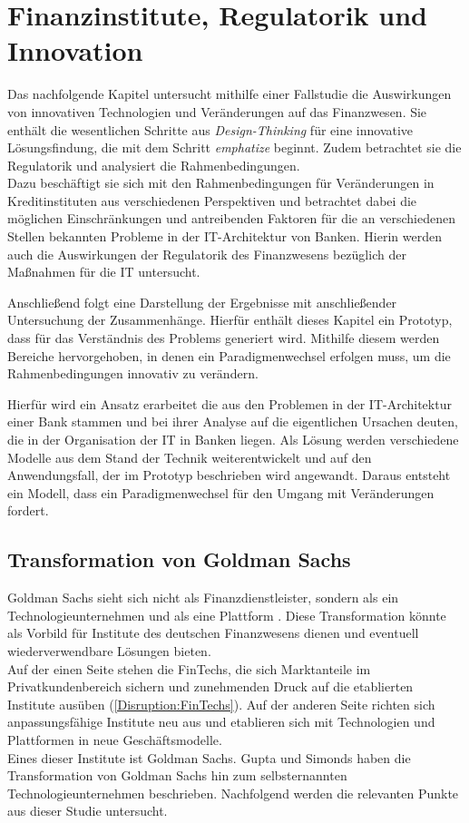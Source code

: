 \chapter{Finanzinstitute, Regulatorik und Innovation}
\label{ch:background}
Das nachfolgende Kapitel untersucht mithilfe einer Fallstudie die Auswirkungen von innovativen Technologien und Veränderungen auf das Finanzwesen. Sie enthält die wesentlichen Schritte aus \emph{Design-Thinking} für eine innovative Lösungsfindung, die mit dem Schritt \emph{emphatize} beginnt. Zudem betrachtet sie die Regulatorik und analysiert die Rahmenbedingungen.
\medskip
\\
Dazu beschäftigt sie sich mit den Rahmenbedingungen für Veränderungen in Kreditinstituten aus verschiedenen Perspektiven und betrachtet dabei die möglichen Einschränkungen und antreibenden Faktoren für die an verschiedenen Stellen bekannten Probleme in der IT-Architektur von Banken. Hierin werden auch die Auswirkungen der Regulatorik des Finanzwesens bezüglich der Maßnahmen für die IT untersucht.

Anschließend folgt eine Darstellung der Ergebnisse mit anschließender Untersuchung der Zusammenhänge. Hierfür enthält dieses Kapitel ein Prototyp, dass für das Verständnis des Problems generiert wird. 
Mithilfe diesem werden Bereiche hervorgehoben, in denen ein Paradigmenwechsel erfolgen muss, um die Rahmenbedingungen innovativ zu verändern. 

Hierfür wird ein Ansatz erarbeitet die aus den Problemen in der IT-Architektur einer Bank stammen und bei ihrer Analyse auf die eigentlichen Ursachen deuten, die in der Organisation der IT in Banken liegen. Als Lösung werden verschiedene Modelle aus dem Stand der Technik weiterentwickelt und auf den Anwendungsfall, der im Prototyp beschrieben wird angewandt. Daraus entsteht ein Modell, dass ein Paradigmenwechsel für den Umgang mit Veränderungen fordert.

\section{Transformation von Goldman Sachs}
\label{section:Goldman}
Goldman Sachs sieht sich nicht als Finanzdienstleister, sondern als ein Technologieunternehmen und als eine Plattform \cite{Gupta:2017}. Diese Transformation könnte als Vorbild für Institute des deutschen Finanzwesens dienen und eventuell wiederverwendbare Lösungen bieten.
\medskip
\\
Auf der einen Seite stehen die FinTechs, die sich Marktanteile im Privatkundenbereich sichern und zunehmenden Druck auf die etablierten Institute ausüben (\ref{Disruption:FinTechs}). Auf der anderen Seite richten sich anpassungsfähige Institute neu aus und etablieren sich mit Technologien und Plattformen in neue Geschäftsmodelle. 
\medskip
\\
Eines dieser Institute ist Goldman Sachs.
Gupta und Simonds \cite{Gupta:2017} haben die Transformation von Goldman Sachs hin zum selbsternannten Technologieunternehmen \cite{Gupta:2017} beschrieben. Nachfolgend werden die relevanten Punkte aus dieser Studie untersucht.
%

